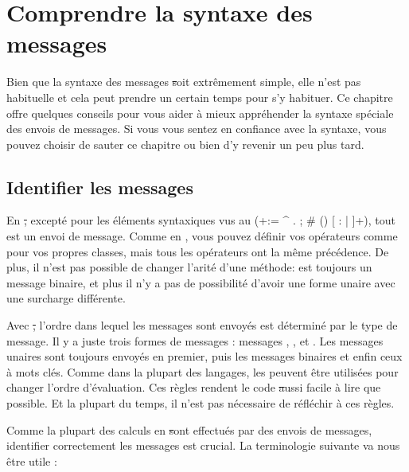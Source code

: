 \documentclass[a4paper,10pt,twoside]{book}
\begin{document}
	\renewcommand{\nnbb}[2]{} %
	\sloppy
\fi
\chapter{Comprendre la syntaxe des messages}
\label{cha:understanding}

Bien que la syntaxe des messages \st soit extr\^emement simple, elle n'est pas habituelle et cela peut prendre un certain temps pour s'y habituer. Ce chapitre offre quelques conseils pour vous aider \`a mieux appr\'ehender la syntaxe sp\'eciale des envois de messages.
Si vous vous sentez en confiance avec la syntaxe, vous pouvez choisir de sauter ce chapitre ou bien d'y revenir un peu plus tard.




\section{Identifier les messages}

En \st, except\'e pour les \'el\'ements syntaxiques vus au  (\ct+:= ^ . ; # () {} [ : | ]+), tout est un envoi de message.
Comme en , vous pouvez d\'efinir vos op\'erateurs comme \ct{+} pour vos propres classes, mais tous les op\'erateurs ont la m\^eme pr\'ec\'edence.
De plus, il n'est pas possible de changer l'arit\'e d'une m\'ethode: \ct{-} est toujours un message binaire, et plus il n'y a pas de possibilit\'e d'avoir une forme unaire avec une surcharge diff\'erente.


Avec \st, l'ordre dans lequel les messages sont envoy\'es est d\'etermin\'e par le type de message. Il y a juste trois formes de messages : messages , , et . Les messages unaires sont toujours envoy\'es en premier, puis les messages binaires et enfin ceux \`a mots cl\'es. Comme dans la plupart des langages,  les  peuvent \^etre utilis\'ees pour changer l'ordre d'\'evaluation. Ces r\`egles rendent le code \st aussi facile \`a lire que possible. Et la plupart du temps, il n'est pas n\'ecessaire de r\'efl\'echir \`a ces r\`egles.


Comme la plupart des calculs en \st sont effectu\'es par des envois de messages, identifier correctement les messages est crucial. La terminologie suivante va nous \^etre utile :
\end{document}
